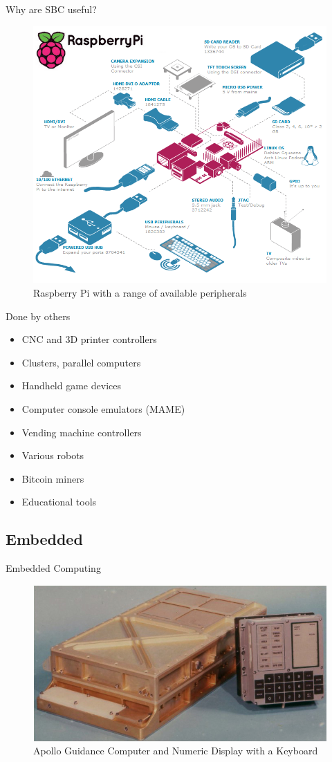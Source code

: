 \documentclass[hyperref={unicode}]{beamer}
\begin{document}
\begin{frame}{Why are SBC useful?}
\begin{figure}
\includegraphics[width=.7\textwidth]{raspi-peripherals.png}
\caption{Raspberry Pi with a range of available peripherals}
\end{figure}
\end{frame}


\begin{frame}{Done by others}
	\begin{itemize}
	\item CNC and 	3D printer controllers
	\item Clusters, parallel computers	
	\item Handheld game devices
	\item Computer console emulators (MAME)
	\item Vending machine controllers
	\item Various robots
	\item Bitcoin miners
	\item Educational tools
	\end{itemize}
\end{frame}



\subsection{Embedded}

\begin{frame}{Embedded Computing}
	\begin{figure}
	\includegraphics[width=.8\textwidth]{apollo-guidance.jpg}
	\caption{Apollo Guidance Computer and Numeric Display with a Keyboard}
	\end{figure}
\end{frame}
\end{document}
